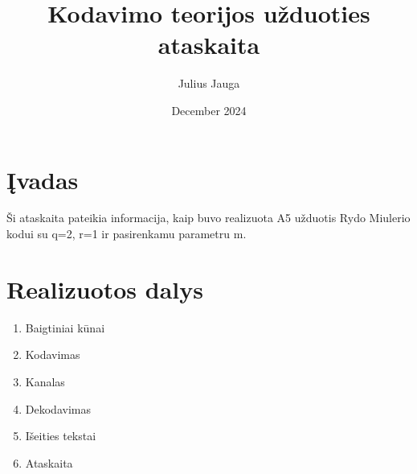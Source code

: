 \documentclass{article}
\title{Kodavimo teorijos užduoties ataskaita}
\author{Julius Jauga}
\date{December 2024}
\begin{document}
\maketitle

\tableofcontents


\section{Įvadas}
Ši ataskaita pateikia informacija, kaip buvo realizuota A5 užduotis Rydo Miulerio kodui su q=2, r=1 ir pasirenkamu parametru m.

\section{Realizuotos dalys}
\begin{enumerate}
    \item Baigtiniai kūnai
    \item Kodavimas
    \item Kanalas
    \item Dekodavimas
    \item Išeities tekstai
    \item Ataskaita
\end{enumerate}
\end{document}
